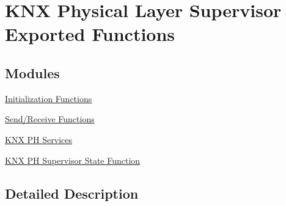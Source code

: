 \hypertarget{group___k_n_x___p_h___sup___exported___functions}{}\section{K\+NX Physical Layer Supervisor Exported Functions}
\label{group___k_n_x___p_h___sup___exported___functions}
\subsection*{Modules}
\begin{DoxyCompactItemize}
\item 
\hyperlink{group___k_n_x___p_h___sup___exported___functions___group1}{Initialization Functions}
\item 
\hyperlink{group___k_n_x___p_h___sup___exported___functions___group2}{Send/\+Receive Functions}
\item 
\hyperlink{group___k_n_x___p_h___sup___exported___functions___group3}{K\+N\+X P\+H Services}
\item 
\hyperlink{group___k_n_x___p_h___sup___exported___functions___group4}{K\+N\+X P\+H Supervisor State Function}
\end{DoxyCompactItemize}


\subsection{Detailed Description}
